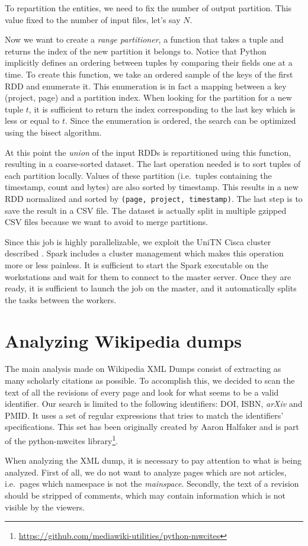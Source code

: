 To repartition the entities, we need to fix the number of output partition.
This value fixed to the number of input files, let's say $N$.

Now we want to create a \emph{range partitioner}, a function that takes a tuple and returns the index of the new partition it belongs to.
Notice that Python implicitly defines an ordering between tuples by comparing their fields one at a time.
To create this function, we take an ordered sample of the keys of the first \ac{RDD} and enumerate it.
This enumeration is in fact a mapping between a key (project, page) and a partition index.
When looking for the partition for a new tuple $t$, it is sufficient to return the index corresponding to the last key which is less or equal to $t$.
Since the enumeration is ordered, the search can be optimized using the bisect algorithm.

At this point the \emph{union} of the input \acp{RDD} is repartitioned using this function, resulting in a coarse-sorted dataset.
The last operation needed is to sort tuples of each partition locally.
Values of these partition (i.e.\ tuples containing the timestamp, count and bytes) are also sorted by timestamp.
This results in a new \ac{RDD} normalized and sorted by \texttt{(page, project, timestamp)}.
The last step is to save the result in a CSV file.
The dataset is actually split in multiple gzipped CSV files because we want to avoid to merge partitions.

Since this job is highly parallelizable, we exploit the UniTN Cisca cluster described .
Spark includes a cluster management which makes this operation more or less painless.
It is sufficient to start the Spark executable on the workstations and wait for them to connect to the master server.
Once they are ready, it is sufficient to launch the job on the master, and it automatically splits the tasks between the workers.

\section{Analyzing Wikipedia dumps}
\label{sec:Analyzing Wikipedia dumps}
The main analysis made on Wikipedia XML Dumps consist of extracting as many scholarly citations as possible.
To accomplish this, we decided to scan the text of all the revisions of every page and look for what seems to be a valid identifier.
Our search is limited to the following identifiers: \ac{DOI}, \ac{ISBN}, \emph{arXiv} and \ac{PMID}.
It uses a set of regular expressions that tries to match the identifiers' specifications.
This set has been originally created by Aaron Halfaker and is part of the python-mwcites library\footnote{\url{https://github.com/mediawiki-utilities/python-mwcites}}.

When analyzing the XML dump, it is necessary to pay attention to what is being analyzed.
First of all, we do not want to analyze pages which are not articles, i.e.\ pages which namespace is not the \emph{mainspace}.
Secondly, the text of a revision should be stripped of comments, which may contain information which is not visible by the viewers.

